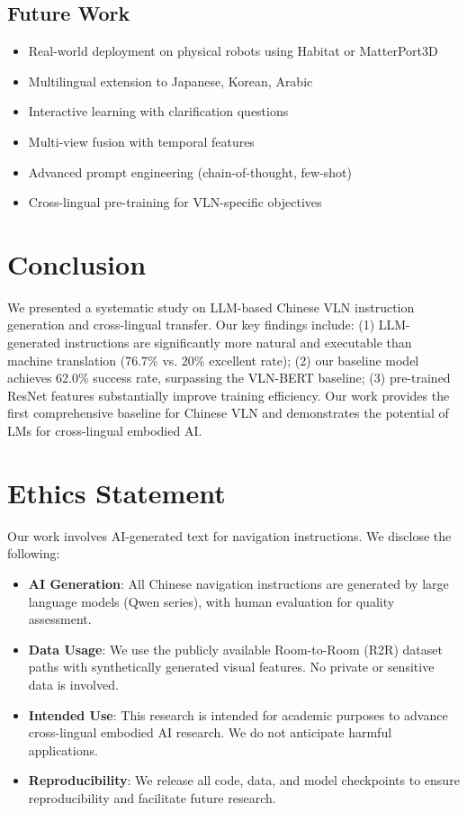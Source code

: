 \documentclass[11pt,a4paper]{article}
\begin{document}
\subsection{Future Work}

\begin{itemize}
    \item Real-world deployment on physical robots using Habitat or MatterPort3D
    \item Multilingual extension to Japanese, Korean, Arabic
    \item Interactive learning with clarification questions
    \item Multi-view fusion with temporal features
    \item Advanced prompt engineering (chain-of-thought, few-shot)
    \item Cross-lingual pre-training for VLN-specific objectives
\end{itemize}

\section{Conclusion}

We presented a systematic study on LLM-based Chinese VLN instruction generation and cross-lingual transfer. Our key findings include: (1) LLM-generated instructions are significantly more natural and executable than machine translation (76.7\% vs. 20\% excellent rate); (2) our baseline model achieves 62.0\% success rate, surpassing the VLN-BERT baseline; (3) pre-trained ResNet features substantially improve training efficiency. Our work provides the first comprehensive baseline for Chinese VLN and demonstrates the potential of LMs for cross-lingual embodied AI.

\section*{Ethics Statement}

Our work involves AI-generated text for navigation instructions. We disclose the following:
\begin{itemize}
    \item \textbf{AI Generation}: All Chinese navigation instructions are generated by large language models (Qwen series), with human evaluation for quality assessment.
    \item \textbf{Data Usage}: We use the publicly available Room-to-Room (R2R) dataset paths with synthetically generated visual features. No private or sensitive data is involved.
    \item \textbf{Intended Use}: This research is intended for academic purposes to advance cross-lingual embodied AI research. We do not anticipate harmful applications.
    \item \textbf{Reproducibility}: We release all code, data, and model checkpoints to ensure reproducibility and facilitate future research.
\end{itemize}
\end{document}

